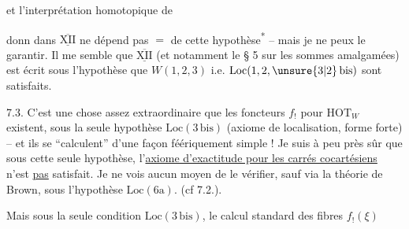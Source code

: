 et l'interprétation homotopique de


donn dans $\underline{\overline{\mathrm{XII}}}$ ne dépend pas $=$ de cette hypothèse\textsuperscript{*}%
 -- mais je ne peux le garantir. Il me semble que $\underline{\overline{\mathrm{XII}}}$ (et notamment le  § 5 sur les sommes amalgamées) est écrit sous l'hypothèse que $W(1,2,3)$ i.e. $\mathrm{Loc}(1,2,\unsure{3|2}\,\mathrm{bis})$ sont satisfaits.

7.3. C'est une chose assez extraordinaire que les foncteurs $f_!$ pour $\mathrm{HOT}_W$ existent, sous la seule hypothèse \uline{$\mathrm{Loc}(3\,\mathrm{bis})$} (axiome de localisation, forme forte) -- et ils se ``calculent'' d'une façon féériquement simple !%
 Je suis à peu près sûr que sous cette seule hypothèse, l'\uline{axiome d'exactitude pour les carrés cocartésiens} n'est \uline{pas} satisfait. Je ne vois aucun moyen de le vérifier, sauf via la théorie de Brown, sous l'hypothèse \uline{$\mathrm{Loc}(6\mathrm{a})$}. (cf 7.2.).

 Mais sous la seule condition $\mathrm{Loc}(3\,\mathrm{bis})$, le calcul standard des fibres  $f_!(\xi)$
